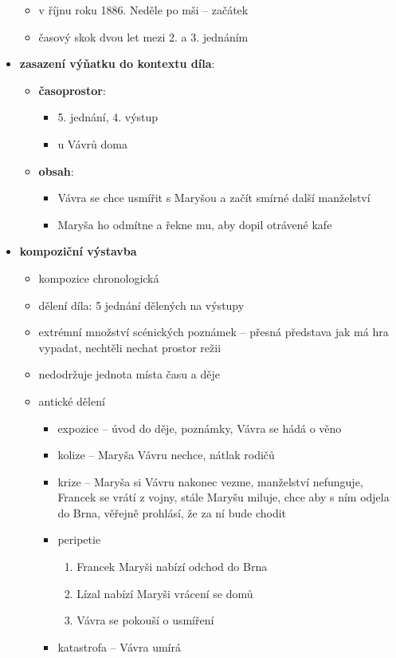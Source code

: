 \documentclass[10pt,a4paper]{article}
\begin{document}
\begin{itemize}
\begin{itemize}
\begin{itemize}
		\end{itemize}
	\item v říjnu roku 1886. Neděle po mši -- začátek
	\item časový skok dvou let mezi 2. a 3. jednáním
	\end{itemize}
\item \textbf{zasazení výňatku do kontextu díla}:
	\begin{itemize}
	\item \textbf{časoprostor}:
		\begin{itemize}
		\item 5. jednání, 4. výstup
		\item u Vávrů doma
		\end{itemize}
	\item \textbf{obsah}: 
		\begin{itemize}
		\item Vávra se chce usmířit s Maryšou a začít smírné další manželství
		\item Maryša ho odmítne a řekne mu, aby dopil otrávené kafe
		\end{itemize}
	\end{itemize}
\item \textbf{kompoziční výstavba}
	\begin{itemize}
	\item kompozice chronologická
	\item dělení díla: 5 jednání dělených na výstupy
	\item extrémní množství scénických poznámek -- přesná představa jak má hra vypadat, nechtěli nechat prostor režii
	\item nedodržuje jednota místa času a děje
	\item antické dělení
		\begin{itemize}
		\item expozice -- úvod do děje, poznámky, Vávra se hádá o věno
		\item kolize -- Maryša Vávru nechce, nátlak rodičů
		\item krize -- Maryša si Vávru nakonec vezme, manželství nefunguje, Francek se vrátí z vojny, stále Maryšu miluje, chce aby s ním odjela do Brna, věřejně prohlásí, že za ní bude chodit
		\item peripetie
			\begin{enumerate}
			\item Francek Maryši nabízí odchod do Brna
			\item Lízal nabízí Maryši vrácení se domů
			\item Vávra se pokouší o usmíření
			\end{enumerate}
		\item katastrofa -- Vávra umírá
		\end{itemize}
	\end{itemize}
\end{itemize}
\end{document}
